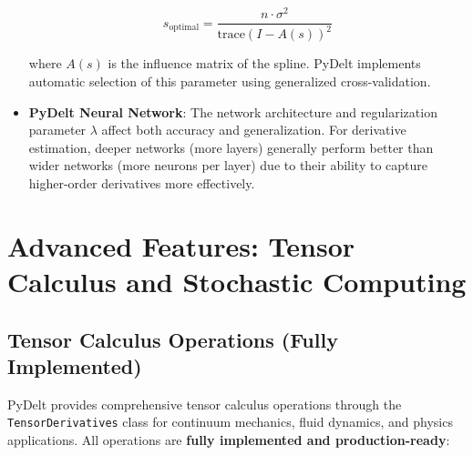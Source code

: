 \documentclass[10pt,journal,compsoc]{IEEEtran}
\begin{document}
\begin{itemize}
    \begin{equation}
        s_{\text{optimal}} = \frac{n \cdot \sigma^2}{\text{trace}(I - A(s))^2}
    \end{equation}
    
    where $A(s)$ is the influence matrix of the spline. PyDelt implements automatic selection of this parameter using generalized cross-validation.
    
    \item \textbf{PyDelt Neural Network}: The network architecture and regularization parameter $\lambda$ affect both accuracy and generalization. For derivative estimation, deeper networks (more layers) generally perform better than wider networks (more neurons per layer) due to their ability to capture higher-order derivatives more effectively.
\end{itemize}

\section{Advanced Features: Tensor Calculus and Stochastic Computing}

\subsection{Tensor Calculus Operations (Fully Implemented)}

PyDelt provides comprehensive tensor calculus operations through the \texttt{TensorDerivatives} class for continuum mechanics, fluid dynamics, and physics applications. All operations are \textbf{fully implemented and production-ready}:
\end{document}
